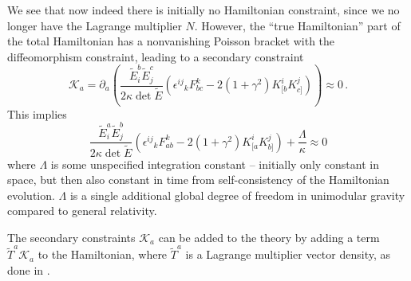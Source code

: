 \documentclass[aps,prd,11pt,showkeys,nofootinbib]{revtex4-2}
\begin{document}
We see that now indeed there is initially no Hamiltonian constraint, since we no longer have the Lagrange multiplier $N$. However, the ``true Hamiltonian'' part of the total Hamiltonian has a nonvanishing Poisson bracket with the diffeomorphism constraint, leading to a secondary constraint
\begin{equation}
\mathcal{K}_a = \partial_a \left( \frac{\tilde{E}^b_i\tilde{E}^c_j}{2\kappa\det \tilde{E}}\left({\epsilon^{ij}}_k F^k_{bc}-2(1+\gamma^2)K^i_{[b}K^j_{c]}\right) \right) \approx 0\,.
\label{eq:newconst}
\end{equation}
This implies
\begin{equation}
\frac{\tilde{E}^a_i\tilde{E}^b_j}{2\kappa\det \tilde{E}}\left({\epsilon^{ij}}_k F^k_{ab}-2(1+\gamma^2)K^i_{[a}K^j_{b]}\right) +\frac{\Lambda}{\kappa} \approx 0
\label{eq:lambdaconst}
\end{equation}
where $\Lambda$ is some unspecified integration constant -- initially only constant in space, but then also constant in time from self-consistency of the Hamiltonian evolution. $\Lambda$ is a single additional global degree of freedom in unimodular gravity compared to general relativity.

The secondary constraints $\mathcal{K}_a$ can be added to the theory by adding a term $\tilde{T}^a\mathcal{K}_a$ to the Hamiltonian, where $\tilde{T}^a$ is a Lagrange multiplier vector density, as done in \cite{Gielen:2024gfb}.
\end{document}
